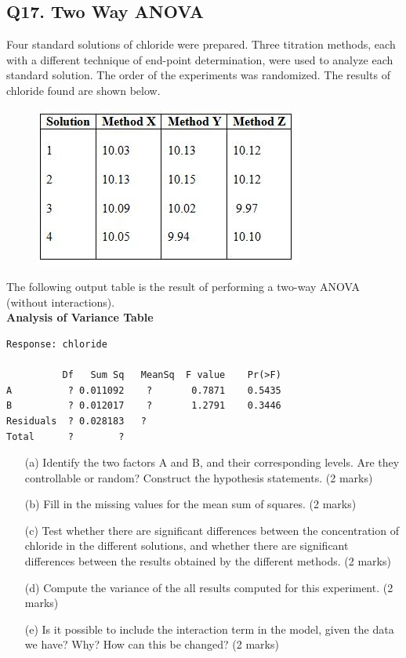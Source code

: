 \documentclass[a4paper,12pt]{article}
\begin{document}
\subsection*{Q17. Two Way ANOVA } %
Four standard solutions of chloride were prepared. Three titration methods, each with a different technique of end-point determination, were used to analyze each standard solution. The order of the experiments was randomized. The results of chloride found are shown below.
\begin{figure}[h!]
\centering
\includegraphics[width=0.5\linewidth]{image/TwoWayANOVAdata}

\end{figure}
\noindent The following output table is the result of performing a two-way ANOVA (without
interactions). \\

\bigskip
\noindent \textbf{Analysis of Variance Table}
\begin{framed}
	{
		\Large
\begin{verbatim}
Response: chloride

          Df   Sum Sq   MeanSq  F value    Pr(>F)
A          ? 0.011092 	 ?       0.7871    0.5435
B          ? 0.012017 	 ?       1.2791    0.3446
Residuals  ? 0.028183   ?      
Total      ?        ?              
\end{verbatim}
}
\end{framed}

\begin{itemize}
\item[(a)]	Identify the two factors A and B, and their corresponding levels. Are they controllable or random? Construct the hypothesis statements.
(2 marks)
\item[(b)]	 Fill in the missing values for the mean sum of squares.
(2 marks)
\item[(c)]	Test whether there are significant differences between the concentration of chloride in the different solutions, and whether there are significant differences between the results obtained by the different methods.
(2 marks)
\item[(d)]	Compute the variance of the all results computed for this experiment.
(2 marks)
\item[(e)]	Is it possible to include the interaction term in the model, given the data we have? Why? How can this be changed?
(2 marks)
\end{itemize}
\end{document}
